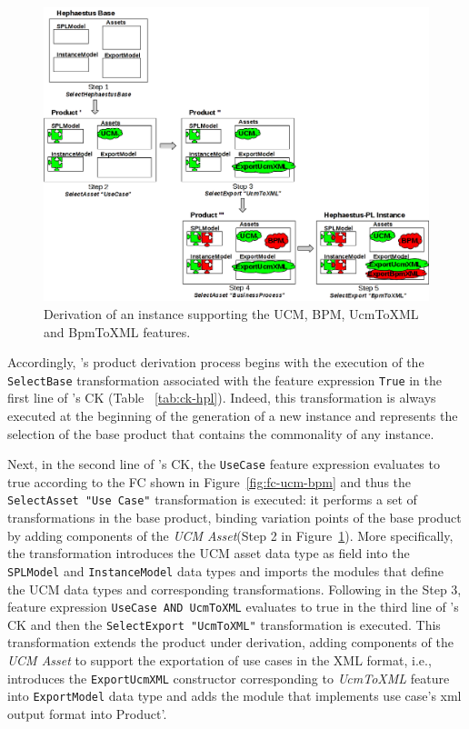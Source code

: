 \begin{figure}[t!]
\begin{center}
\includegraphics[width=\textwidth]{imagens/derivation.png}
\end{center}
\caption{Derivation of an \hpl{} instance supporting the UCM, BPM, UcmToXML and BpmToXML features.}
\label{fig:derivationHPL}
\end{figure}


Accordingly, \hpl's product derivation process begins with the execution of the \texttt{SelectBase} transformation associated with the feature expression \texttt{True} in the first line of \hpl's CK (Table ~\ref{tab:ck-hpl}). Indeed, this transformation is always executed at the beginning of the generation of a new \hpl{} instance and represents the selection of the base product that contains the commonality of any \hpl{} instance.

Next, in the second line of \hpl's CK, the \texttt{UseCase} feature expression evaluates to true according to the FC shown in Figure~\ref{fig:fc-ucm-bpm} and thus the \texttt{SelectAsset "Use Case"} transformation is executed: it performs a set of transformations in the base product, binding variation points of the base product by adding components of the \textit{UCM Asset}(Step 2 in Figure~\ref{fig:derivationHPL}).  More specifically, the transformation introduces the UCM asset data type as field into the \texttt{SPLModel} and \texttt{InstanceModel} data types and imports the modules that define the UCM data types and corresponding transformations.  Following in the Step 3, feature expression \texttt{UseCase AND UcmToXML} evaluates to true in the third line of \hpl's CK and then the \texttt{SelectExport "UcmToXML"} transformation is executed. This transformation extends the product under derivation, adding components of the \textit{UCM Asset} to support the exportation of use cases in the XML format, i.e., introduces the \texttt{ExportUcmXML} constructor corresponding to \textit{UcmToXML} feature into \texttt{ExportModel} data type and adds the module that implements use case's xml output format into Product'.

